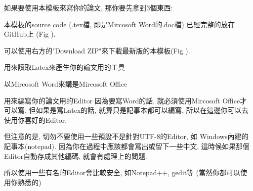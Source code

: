 
如果要使用本模板來寫你的論文, 那你要先拿到3個東西:


本模板的source code (.tex檔, 即是Mircosoft Word的.doc檔) 已經完整的放在GitHub上 (Fig ).


可以使用右方的"Download ZIP"來下載最新版的本模板(Fig ).


用來讀取Latex來產生你的論文用的工具

以Mircosoft Word來講是Mircosoft Office


用來編寫你的論文用的Editor
因為要寫Word的話, 就必須使用Mircosoft Office才可以寫. 但如果是寫Latex的話, 就算只是記事本都可以編寫, 所以在這邊你可以去使用你喜好的Editor.

但注意的是, 切勿不要使用一些預設不是針對UTF-8的Editor, 如 Windows內建的記事本(notepad). 因為你在過程中應該都會寫出或留下一些中文, 這時候如果那個Editor自動存成其他編碼, 就會有處理上的問題.

所以使用一些有名的Editor會比較安全, 如Notepad++, gedit等 (當然你都可以使用你熟悉的)




